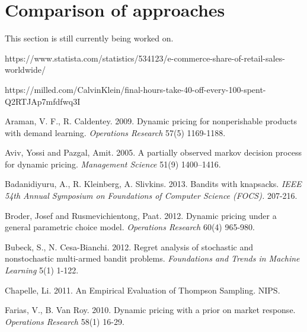 \documentclass[a4paper]{article}
\begin{document}
\section{Comparison of approaches}
This section is still currently being worked on.
\begin{thebibliography}{9}
	https://www.statista.com/statistics/534123/e-commerce-share-of-retail-sales-worldwide/
	
	https://milled.com/CalvinKlein/final-hours-take-40-off-every-100-spent-Q2RTJAp7mfdfwq3I
	
	Araman, V. F., R. Caldentey. 2009. Dynamic pricing for nonperishable products with demand learning.
	\emph{Operations Research} 57(5) 1169-1188.
	
	Aviv, Yossi and Pazgal, Amit. 2005. A partially observed markov decision process for dynamic
	pricing. \emph{Management Science} 51(9) 1400–1416.
	
	Badanidiyuru, A., R. Kleinberg, A. Slivkins. 2013. Bandits with knapsacks. \emph{IEEE 54th Annual Symposium on Foundations of Computer Science (FOCS).} 207-216.	
	
	Broder, Josef and Rusmevichientong, Paat. 2012. Dynamic pricing under a general parametric choice model. \emph{Operations Research} 60(4) 965-980.
	
	Bubeck, S., N. Cesa-Bianchi. 2012. Regret analysis of stochastic and nonstochastic multi-armed bandit problems. \emph{Foundations and Trends in Machine Learning} 5(1) 1-122.
	
	Chapelle,  Li. 2011. An Empirical Evaluation of Thompson Sampling. NIPS. 
	
	Farias, V., B. Van Roy. 2010. Dynamic pricing with a prior on market response. \emph{Operations Research} 58(1) 16-29.
\end{thebibliography}
\end{document}
